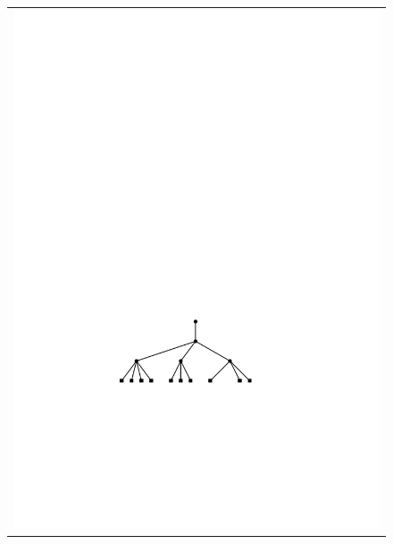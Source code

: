 \begin{figure}
\begin{center}
\begin{tabular}{c}
			\includegraphics[height=\FifthHeightScaleIfNeeded]{figs/24tree-remove-4} \\

\end{tabular}
\end{center}
\end{figure}
